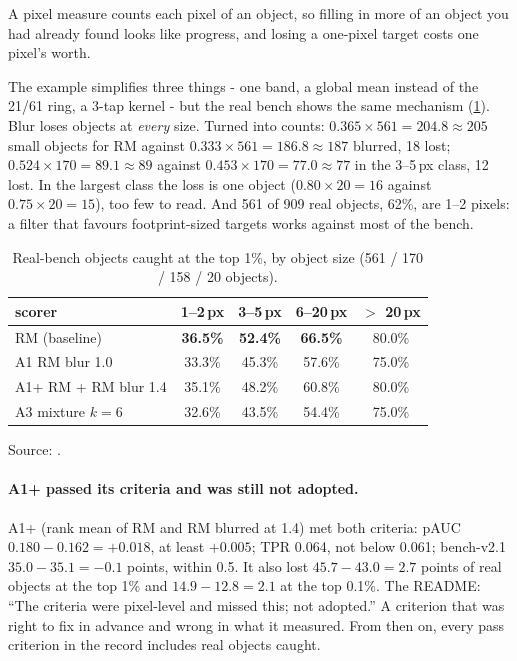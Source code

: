 \begin{keypoint}
A pixel measure counts each pixel of an object, so filling in more of an object you had already found looks like progress,
and losing a one-pixel target costs one pixel's worth.
\end{keypoint}

The example simplifies three things - one band, a global mean instead of the 21/61 ring, a 3-tap kernel - but the real
bench shows the same mechanism (\cref{tab:scoringgains:size}). Blur loses objects at \emph{every} size. Turned into counts:
$0.365 \times 561 = 204.8 \approx 205$ small objects for RM against $0.333 \times 561 = 186.8 \approx 187$ blurred, 18
lost; $0.524 \times 170 = 89.1 \approx 89$ against $0.453 \times 170 = 77.0 \approx 77$ in the 3--5\,px class, 12 lost. In
the largest class the loss is one object ($0.80 \times 20 = 16$ against $0.75 \times 20 = 15$), too few to read. And 561 of
909 real objects, 62\%, are 1--2 pixels: a filter that favours footprint-sized targets works against most of the bench.

\begin{table}[htbp]
\centering
\caption{Real-bench objects caught at the top 1\%, by object size (561 / 170 / 158 / 20 objects).}
\label{tab:scoringgains:size}
\small
\begin{tabular}{lcccc}
\toprule
scorer & 1--2\,px & 3--5\,px & 6--20\,px & $>$ 20\,px \\
\midrule
RM (baseline) & \textbf{36.5\%} & \textbf{52.4\%} & \textbf{66.5\%} & 80.0\% \\
A1 RM blur 1.0 & 33.3\% & 45.3\% & 57.6\% & 75.0\% \\
A1+ RM + RM blur 1.4 & 35.1\% & 48.2\% & 60.8\% & 80.0\% \\
A3 mixture $k = 6$ & 32.6\% & 43.5\% & 54.4\% & 75.0\% \\
\bottomrule
\end{tabular}

\smallskip
{\footnotesize Source: .}
\end{table}

\paragraph{A1+ passed its criteria and was still not adopted.} A1+ (rank mean of RM and RM blurred at 1.4) met both
criteria: pAUC $0.180 - 0.162 = +0.018$, at least $+0.005$; TPR 0.064, not below 0.061; bench-v2.1 $35.0 - 35.1 = -0.1$
points, within 0.5. It also lost $45.7 - 43.0 = 2.7$ points of real objects at the top 1\% and $14.9 - 12.8 = 2.1$ at the
top 0.1\%. The README: ``The criteria were pixel-level and missed this; not adopted.'' A criterion that was right to fix in
advance and wrong in what it measured. From then on, every pass criterion in the record includes real objects caught.

